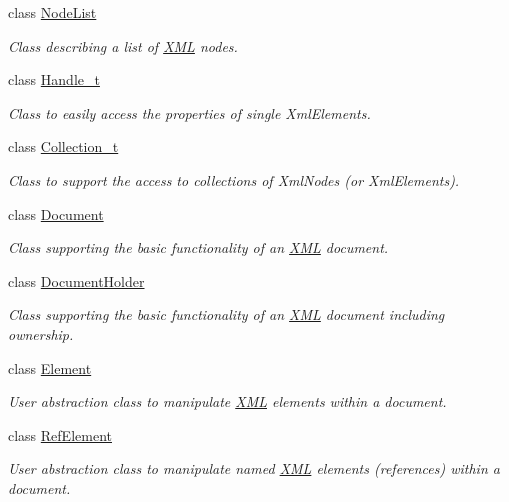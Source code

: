 \begin{DoxyCompactItemize}
class \hyperlink{class_d_d4hep_1_1_x_m_l_1_1_node_list}{NodeList}
\begin{DoxyCompactList}\small\item\em Class describing a list of \hyperlink{namespace_d_d4hep_1_1_x_m_l}{XML} nodes. \item\end{DoxyCompactList}\item 
class \hyperlink{class_d_d4hep_1_1_x_m_l_1_1_handle__t}{Handle\_\-t}
\begin{DoxyCompactList}\small\item\em Class to easily access the properties of single XmlElements. \item\end{DoxyCompactList}\item 
class \hyperlink{class_d_d4hep_1_1_x_m_l_1_1_collection__t}{Collection\_\-t}
\begin{DoxyCompactList}\small\item\em Class to support the access to collections of XmlNodes (or XmlElements). \item\end{DoxyCompactList}\item 
class \hyperlink{class_d_d4hep_1_1_x_m_l_1_1_document}{Document}
\begin{DoxyCompactList}\small\item\em Class supporting the basic functionality of an \hyperlink{namespace_d_d4hep_1_1_x_m_l}{XML} document. \item\end{DoxyCompactList}\item 
class \hyperlink{class_d_d4hep_1_1_x_m_l_1_1_document_holder}{DocumentHolder}
\begin{DoxyCompactList}\small\item\em Class supporting the basic functionality of an \hyperlink{namespace_d_d4hep_1_1_x_m_l}{XML} document including ownership. \item\end{DoxyCompactList}\item 
class \hyperlink{class_d_d4hep_1_1_x_m_l_1_1_element}{Element}
\begin{DoxyCompactList}\small\item\em User abstraction class to manipulate \hyperlink{namespace_d_d4hep_1_1_x_m_l}{XML} elements within a document. \item\end{DoxyCompactList}\item 
class \hyperlink{class_d_d4hep_1_1_x_m_l_1_1_ref_element}{RefElement}
\begin{DoxyCompactList}\small\item\em User abstraction class to manipulate named \hyperlink{namespace_d_d4hep_1_1_x_m_l}{XML} elements (references) within a document. \item\end{DoxyCompactList}\end{DoxyCompactItemize}
